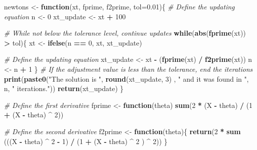 \documentclass[]{article}
\newenvironment{Shaded}{\begin{snugshade}}{\end{snugshade}}
\newcommand{\KeywordTok}[1]{\textcolor[rgb]{0.13,0.29,0.53}{\textbf{#1}}}
\newcommand{\DataTypeTok}[1]{\textcolor[rgb]{0.13,0.29,0.53}{#1}}
\newcommand{\DecValTok}[1]{\textcolor[rgb]{0.00,0.00,0.81}{#1}}
\newcommand{\FloatTok}[1]{\textcolor[rgb]{0.00,0.00,0.81}{#1}}
\newcommand{\StringTok}[1]{\textcolor[rgb]{0.31,0.60,0.02}{#1}}
\newcommand{\CommentTok}[1]{\textcolor[rgb]{0.56,0.35,0.01}{\textit{#1}}}
\newcommand{\ControlFlowTok}[1]{\textcolor[rgb]{0.13,0.29,0.53}{\textbf{#1}}}
\newcommand{\OperatorTok}[1]{\textcolor[rgb]{0.81,0.36,0.00}{\textbf{#1}}}
\newcommand{\NormalTok}[1]{#1}
\begin{document}
\begin{Shaded}
\begin{Highlighting}[]
\NormalTok{newtons <-}\StringTok{ }\ControlFlowTok{function}\NormalTok{(xt, fprime, f2prime, }\DataTypeTok{tol=}\FloatTok{0.01}\NormalTok{)\{}
  \CommentTok{# Define the updating equation}
\NormalTok{  n <-}\StringTok{ }\DecValTok{0}
\NormalTok{  xt_update <-}\StringTok{ }\NormalTok{xt }\OperatorTok{+}\StringTok{ }\DecValTok{100}  
  
  \CommentTok{# While not below the tolerance level, continue updates}
  \ControlFlowTok{while}\NormalTok{(}\KeywordTok{abs}\NormalTok{(}\KeywordTok{fprime}\NormalTok{(xt)) }\OperatorTok{>}\StringTok{ }\NormalTok{tol)\{}
\NormalTok{    xt <-}\StringTok{ }\KeywordTok{ifelse}\NormalTok{(n }\OperatorTok{==}\StringTok{ }\DecValTok{0}\NormalTok{, xt, xt_update)}
    
    \CommentTok{# Define the updating equation}
\NormalTok{    xt_update <-}\StringTok{ }\NormalTok{xt }\OperatorTok{-}\StringTok{ }\NormalTok{(}\KeywordTok{fprime}\NormalTok{(xt) }\OperatorTok{/}\StringTok{ }\KeywordTok{f2prime}\NormalTok{(xt))}
\NormalTok{    n <-}\StringTok{ }\NormalTok{n }\OperatorTok{+}\StringTok{ }\DecValTok{1}
\NormalTok{  \}}
  \CommentTok{# If the adjustment value is less than the tolerance, end the iterations}
  \KeywordTok{print}\NormalTok{(}\KeywordTok{paste0}\NormalTok{(}\StringTok{"The solution is "}\NormalTok{, }\KeywordTok{round}\NormalTok{(xt_update, }\DecValTok{3}\NormalTok{) , }\StringTok{" and it was found in "}\NormalTok{, n, }\StringTok{" iterations."}\NormalTok{))}
  \KeywordTok{return}\NormalTok{(xt_update)}
\NormalTok{\}}

\CommentTok{# Define the first derivative}
\NormalTok{fprime <-}\StringTok{ }\ControlFlowTok{function}\NormalTok{(theta) }\KeywordTok{sum}\NormalTok{(}\DecValTok{2} \OperatorTok{*}\StringTok{ }\NormalTok{(X }\OperatorTok{-}\StringTok{ }\NormalTok{theta) }\OperatorTok{/}\StringTok{ }\NormalTok{(}\DecValTok{1} \OperatorTok{+}\StringTok{ }\NormalTok{(X }\OperatorTok{-}\StringTok{ }\NormalTok{theta) }\OperatorTok{^}\StringTok{ }\DecValTok{2}\NormalTok{))}

\CommentTok{# Define the second derivative}
\NormalTok{f2prime <-}\StringTok{ }\ControlFlowTok{function}\NormalTok{(theta)\{}
  \KeywordTok{return}\NormalTok{(}\DecValTok{2} \OperatorTok{*}\StringTok{ }\KeywordTok{sum}\NormalTok{ (((X }\OperatorTok{-}\StringTok{ }\NormalTok{theta) }\OperatorTok{^}\StringTok{ }\DecValTok{2} \OperatorTok{-}\StringTok{ }\DecValTok{1}\NormalTok{) }\OperatorTok{/}\StringTok{ }\NormalTok{(}\DecValTok{1} \OperatorTok{+}\StringTok{ }\NormalTok{(X }\OperatorTok{-}\StringTok{ }\NormalTok{theta) }\OperatorTok{^}\StringTok{ }\DecValTok{2}\NormalTok{ ) }\OperatorTok{^}\StringTok{ }\DecValTok{2}\NormalTok{))}
\NormalTok{\}}


\end{Highlighting}
\end{Shaded}
\end{document}
